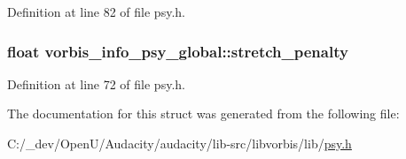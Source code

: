 Definition at line 82 of file psy.\+h.

\subsubsection[{\texorpdfstring{stretch\+\_\+penalty}{stretch_penalty}}]{\setlength{\rightskip}{0pt plus 5cm}float vorbis\+\_\+info\+\_\+psy\+\_\+global\+::stretch\+\_\+penalty}\hypertarget{structvorbis__info__psy__global_a18a1fc853e4c5a7fe425de4404a15637}{}\label{structvorbis__info__psy__global_a18a1fc853e4c5a7fe425de4404a15637}


Definition at line 72 of file psy.\+h.



The documentation for this struct was generated from the following file\+:\begin{DoxyCompactItemize}
\item 
C\+:/\+\_\+dev/\+Open\+U/\+Audacity/audacity/lib-\/src/libvorbis/lib/\hyperlink{psy_8h}{psy.\+h}\end{DoxyCompactItemize}
